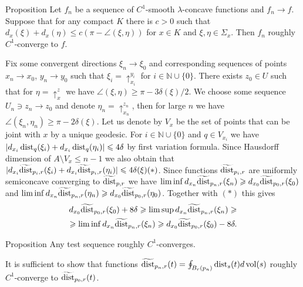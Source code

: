 \begin{thm}{Proposition}
Let $f_n$ be a sequence of $C^1$-smooth $\lambda$-concave functions
and
$f_n\to f$.
Suppose that for any compact $K$ there is $c>0$ such that
$d_x(\xi)+d_x(\eta)\le c(\pi-\angle(\xi,\eta))$
for $x\in K$ and $\xi, \eta\in \Sigma_x$.
Then $f_n$ roughly $C^1$-converge to $f$. 
\end{thm}

Fix some convergent directions $\xi_n\to\xi_0$ and
corresponding sequences of points
$x_n\to x_0$, $y_n\to y_0$
such that  $\xi_i=\uparrow_{x_i}^{y_i}$ for $i\in\mathbb N\cup\{0\}$.
There exists $z_0 \in U$ such that for $\eta=\uparrow_x^z$ 
we have
$\angle(\xi,\eta)\ge \pi-3\delta(\xi)/2$.
We choose some sequence 
$U_n\ni z_n\to z_0$
and denote
$\eta_n=\uparrow_{x_n}^{z_n}$,
then for large $n$ we have $\angle(\xi_n,\eta_n)\ge \pi-2\delta(\xi)$.
Let us denote by $V_x$ be the set of points that can be joint with $x$
by a unique geodesic. For $i\in\mathbb N\cup\{0\}$ and
$q\in V_{x_i}$ we have $|d_{x_i} \operatorname{dist}_q(\xi_i)+d_{x_i} \operatorname{dist}_q(\eta_i)|\leqslant 4\delta$ by first
variation formula.
Since Hausdorff dimension of $A\setminus V_x\le n-1$ we also obtain
that
$|d_{x_i} \widetilde{\operatorname{dist}}_{p_i,r}(\xi_i)+d_{x_i} \widetilde{\operatorname{dist}}_{p_i,r}(\eta_i)|\leqslant 4\delta(\xi) (*)$.
Since functions
$\widetilde{\operatorname{dist}}_{p_i,r}$ are uniformly semiconcave converging to
$\widetilde{\operatorname{dist}}_{p,r}$ we have
$\liminf d_{x_n}\widetilde{\operatorname{dist}}_{p_n,r}(\xi_n)\geqslant d_{x_0}\widetilde{\operatorname{dist}}_{p_0,r}(\xi_0)$ and $\liminf d_{x_n}\widetilde{\operatorname{dist}}_{p_n,r}(\eta_n)\geqslant d_{x_0}\widetilde{\operatorname{dist}}_{p_0,r}(\eta_0)$.
Together with $(*)$ this gives
\begin{align*}
 d_{x_0}\widetilde{\operatorname{dist}}_{p_0,r}(\xi_0)+8\delta\geqslant
\limsup d_{x_n}\widetilde{\operatorname{dist}}_{p_n,r}(\xi_n)\geqslant\\
\geqslant
\liminf d_{x_n}\widetilde{\operatorname{dist}}_{p_n,r}(\xi_n)\geqslant d_{x_0}\widetilde{\operatorname{dist}}_{p_0,r}(\xi_0)-8\delta.
\end{align*}





\begin{thm}{Proposition}
Any test sequence roughly $C^1$-converges.
\end{thm}
It is sufficient to show  that functions
$\widetilde{\operatorname{dist}}_{p_n,r}(t) =\oint_{B_r(p_n)} \operatorname{dist}_{s}(t)d\operatorname{vol}(s)$
roughly $C^1$-converge to $\widetilde{\operatorname{dist}}_{p_0,r}(t)$.

